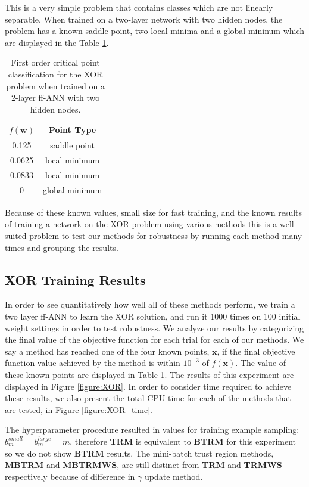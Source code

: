 \documentclass[letterpaper,12pt,titlepage,oneside,final]{book}
\begin{document}
	This is a very simple problem that contains classes which are not linearly separable. When trained on a two-layer network with two hidden nodes, the problem has a known saddle point, two local minima and a global mininum which are displayed in the Table \ref{table:XOR_point_type}.
	
	\begin{table}[h] 
		\centering 
		\begin{tabular}{ |c|c| } 
			\hline 
			$f(\mathbf{w})$ & \textbf{Point Type}\\ 
			\hline
			0.125 & saddle point\\  
			0.0625 & local minimum\\ 
			0.0833 & local minimum\\ 
			0 & global minimum\\ 
			\hline 
		\end{tabular} 
		\caption{First order critical point classification for the XOR problem when trained on a 2-layer ff-ANN with two hidden nodes.} \label{table:XOR_point_type} \end{table}
	
	Because of these known values, small size for fast training, and the known results of training a network on the XOR problem using various methods this is a well suited problem to test our methods for robustness by running each method many times and grouping the results. 
	
	\subsection{XOR Training Results}
	
	In order to see quantitatively how well all of these methods perform, we train a two layer ff-ANN to learn the XOR solution, and run it 1000 times on 100 initial weight settings in order to test robustness. We analyze our results by categorizing the final value of the objective function for each trial for each of our methods. We say a method has reached one of the four known points, $\mathbf{x}$, if the final objective function value achieved by the method is within $10^{-3}$ of $f(\mathbf{x})$. The value of these known points are displayed in Table \ref{table:XOR_point_type}. The results of this experiment are displayed in Figure \ref{figure:XOR}. In order to consider time required to achieve these results, we also present the total CPU time for each of the methods that are tested, in Figure \ref{figure:XOR_time}.
	
	 The hyperparameter procedure resulted in values for training example sampling: $b_{m}^{small} = b_{m}^{large} = m$, therefore \textbf{TRM} is equivalent to \textbf{BTRM} for this experiment so we do not show \textbf{BTRM} results. The mini-batch trust region methods, \textbf{MBTRM} and \textbf{MBTRMWS}, are still distinct from \textbf{TRM} and \textbf{TRMWS} respectively because of difference in $\gamma$ update method.  
	
\end{document}
